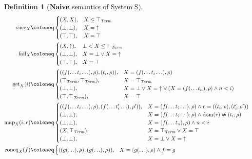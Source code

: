 \documentclass{article}
\newtheorem{definition}[theorem]{Definition}
\newcommand{\fail}{\ensuremath \text{$\uparrow$}}
\newcommand{\dom}{\ensuremath \operatorname{dom}}
\newcommand{\Term}{\ensuremath \mathit{Term}}
\newcommand{\Cat}[1]{\ensuremath \mathbf{#1}}
\newcommand{\Naive}{\ensuremath \Cat{Naive}}
\newcommand{\lfail}{\ensuremath \operatorname{fail}}
\newcommand{\lsucc}{\ensuremath \operatorname{succ}}
\newcommand{\get}{\ensuremath \operatorname{get}}
\newcommand{\map}{\ensuremath \operatorname{map}}
\newcommand{\coneq}{\ensuremath \operatorname{coneq}}
\newcommand{\ttop}{\ensuremath \top_{\Term}}
\begin{document}
\begin{definition}[$\Naive$ semantics of System S]
  \begin{align*}
    \lsucc_X &\coloneq
               \begin{cases} 
                 (X,X), & X \leq \ttop \\
                 (\bot,\bot), & X = \fail \\
                 (\top,\top), & X = \top \\
               \end{cases} \\
    \lfail_X &\coloneq
               \begin{cases} (X,\fail), & \bot < X \leq \ttop \\
                 (\bot,\bot), & X = \bot \lor X = \fail \\
                 (\top,\top), & X = \top \\
               \end{cases} \\
    \get_X(i) &\coloneq
                \begin{cases}
                  ((f(\ldots t_i \ldots),\rho),(t_i,\rho)), & X = (f(\ldots t_i \ldots),\rho) \\
                  (\ttop,\ttop), & X = \ttop \\
                  (\bot,\bot), & X = \bot \lor X = \fail \lor \left(X = (f(\ldots t_n),\rho) \land n < i \right) \\
                  (\top,\ttop), & X = \top \\
                \end{cases} \\
    \map_X(i,r) &\coloneq
                \begin{cases}
                  ((f(\ldots t_i \ldots),\rho),(f(\ldots t_i' \ldots),\rho')), & X = (f(\ldots t_i \ldots),\rho) \land r = ((t_i,\rho),(t_i',\rho')) \\
                  (\bot,\bot), & X = (f(\ldots t_i \ldots),\rho) \land \dom(r) \neq (t_i,\rho) \\
                  (\bot,\bot), & X = (f(\ldots t_n),\rho) \land n < i \\
                  (X,\ttop), & X = \ttop \lor X = \top \\
                  (\bot,\bot), & X = \bot \lor X = \fail \\
                \end{cases} \\
    \coneq_X(f) &\coloneq
                \begin{cases}
                  ((g(\ldots),\rho),(g(\ldots),\rho)), & X = (g(\ldots),\rho) \land f = g \\

\end{cases}
\end{align*}
\end{definition}
\end{document}

